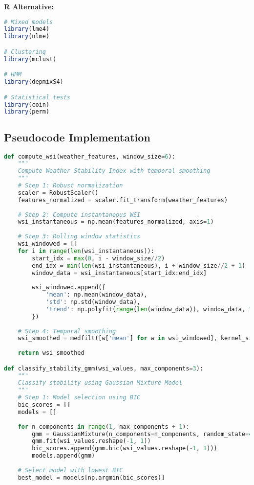 \documentclass[11pt,a4paper]{article}
\begin{document}
\textbf{R Alternative:}
\begin{lstlisting}[language=R]
# Mixed models
library(lme4)
library(nlme)

# Clustering
library(mclust)

# HMM
library(depmixS4)

# Statistical tests
library(coin)
library(perm)
\end{lstlisting}

\subsection{Pseudocode Implementation}

\begin{lstlisting}[language=Python]
def compute_wsi(weather_features, window_size=6):
    """
    Compute Weather Stability Index with temporal smoothing
    """
    # Step 1: Robust normalization
    scaler = RobustScaler()
    features_normalized = scaler.fit_transform(weather_features)
    
    # Step 2: Compute instantaneous WSI
    wsi_instantaneous = np.mean(features_normalized, axis=1)
    
    # Step 3: Rolling window statistics
    wsi_windowed = []
    for i in range(len(wsi_instantaneous)):
        start_idx = max(0, i - window_size//2)
        end_idx = min(len(wsi_instantaneous), i + window_size//2 + 1)
        window_data = wsi_instantaneous[start_idx:end_idx]
        
        wsi_windowed.append({
            'mean': np.mean(window_data),
            'std': np.std(window_data),
            'trend': np.polyfit(range(len(window_data)), window_data, 1)[0]
        })
    
    # Step 4: Temporal smoothing
    wsi_smoothed = medfilt([w['mean'] for w in wsi_windowed], kernel_size=3)
    
    return wsi_smoothed

def classify_stability_gmm(wsi_values, max_components=3):
    """
    Classify stability using Gaussian Mixture Model
    """
    # Step 1: Model selection using BIC
    bic_scores = []
    models = []
    
    for n_components in range(1, max_components + 1):
        gmm = GaussianMixture(n_components=n_components, random_state=42)
        gmm.fit(wsi_values.reshape(-1, 1))
        bic_scores.append(gmm.bic(wsi_values.reshape(-1, 1)))
        models.append(gmm)
    
    # Select model with lowest BIC
    best_model = models[np.argmin(bic_scores)]
    

\end{lstlisting}
\end{document}
